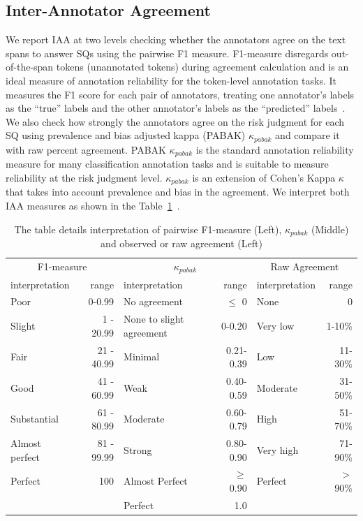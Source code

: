 \documentclass[sn-mathphys,Numbered]{sn-jnl}%
\theoremstyle{thmstyleone}%
\theoremstyle{thmstyletwo}%
\theoremstyle{thmstylethree}%
\begin{document}
\subsection{Inter-Annotator Agreement}
\label{method:iaa}
%
We report IAA at two levels checking whether the annotators agree on the text spans to answer SQs using the pairwise F1 measure.
F1-measure disregards out-of-the-span tokens (unannotated tokens) during agreement calculation and is an ideal measure of annotation reliability for the token-level annotation tasks.
It measures the F1 score for each pair of annotators, treating one annotator's labels as the ``true'' labels and the other annotator's labels as the ``predicted'' labels~\cite{deleger2012building,brandsen2020creating}.
We also check how strongly the annotators agree on the risk judgment for each SQ using prevalence and bias adjusted kappa (PABAK) $\kappa_{pabak}$ and compare it with raw percent agreement.
PABAK $\kappa_{pabak}$ is the standard annotation reliability measure for many classification annotation tasks and is suitable to measure reliability at the risk judgment level.
$\kappa_{pabak}$ is an extension of Cohen's Kappa $\kappa$ that takes into account prevalence and bias in the agreement.
We interpret both IAA measures as shown in the Table~\ref{tab:iaa_interpret}~\cite{mchugh2012interrater,cohen1960coefficient,byrt1993bias,landis1977measurement}.
%
%
%
\begin{center}
 \begin{table}[htb]
   \caption{The table details interpretation of pairwise F1-measure (Left), $\kappa_{pabak}$ (Middle) and observed or raw agreement (Left)}\label{tab:iaa_interpret}
 \centering
    \begin{tabular}{lr|lr|lr}
    \toprule[1.0pt]
    \multicolumn{2}{c|}{F1-measure} & \multicolumn{2}{c|}{$\kappa_{pabak}$}& \multicolumn{2}{c}{Raw Agreement}  \\ 
    interpretation & range & interpretation & range & interpretation & range \\ 
    \midrule[1.0pt]
        Poor & 0-0.99 &  No agreement& $\leq$ 0 & None & 0 \\ 
        Slight & 1 - 20.99 &  None to slight agreement & 0-0.20 & Very low & 1-10\% \\ 
        Fair & 21 - 40.99 &  Minimal & 0.21-0.39 & Low & 11-30\% \\ 
        Good & 41 - 60.99 & Weak & 0.40-0.59 & Moderate & 31-50\% \\ 
        Substantial & 61 - 80.99 & Moderate & 0.60-0.79 & High & 51-70\% \\ 
        Almost perfect & 81 - 99.99 & Strong & 0.80-0.90 & Very high & 71-90\% \\ 
        Perfect & 100 & Almost Perfect & $\geq$ 0.90 & Perfect & $>$90\% \\ 
         & & Perfect & 1.0 \\ 
    \bottomrule[1.0pt]
    \end{tabular}
 \end{table}   
\end{center}
%
%
%
\end{document}
